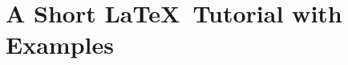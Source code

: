 \chapter{A Short \LaTeX\ Tutorial with Examples}
\label{cha:a_short_latex_tutorial_with_examples}
















